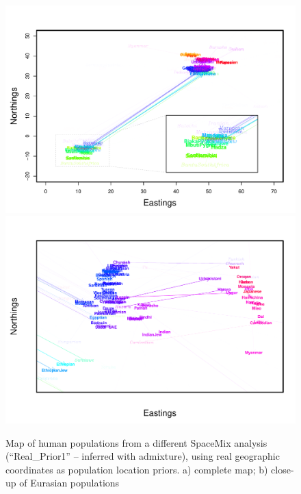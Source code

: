 \documentclass[10pt,letterpaper]{article}
\begin{document}
\clearpage

\begin{figure}
	\centering
			{\includegraphics[width=\textwidth,height=0.71\textwidth]{../figs/globetrotter/globe_Ad_map_AfricaInset_realpr2.pdf}}
			{\includegraphics[width=\textwidth,height=0.71\textwidth]{../figs/globetrotter/eurasia_Ad_map_indproc_realpr2.pdf}}
	\caption{Map of human populations from a different SpaceMix analysis (``Real\_Prior1'' -- inferred with admixture), using real geographic coordinates as population location priors. a) complete map; b) close-up of Eurasian populations}
	\label{sfig:globe_ad_maps_realpr2}
\end{figure}
\end{document}

